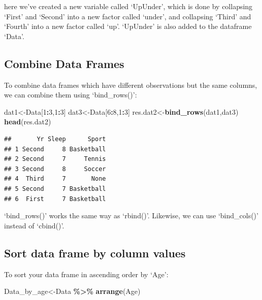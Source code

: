 \documentclass[
  openany]{book}
\newenvironment{Shaded}{\begin{snugshade}}{\end{snugshade}}
\newcommand{\DecValTok}[1]{\textcolor[rgb]{0.00,0.00,0.81}{#1}}
\newcommand{\FunctionTok}[1]{\textcolor[rgb]{0.13,0.29,0.53}{\textbf{#1}}}
\newcommand{\NormalTok}[1]{#1}
\newcommand{\OtherTok}[1]{\textcolor[rgb]{0.56,0.35,0.01}{#1}}
\newcommand{\SpecialCharTok}[1]{\textcolor[rgb]{0.81,0.36,0.00}{\textbf{#1}}}
\begin{document}
here we've created a new variable called `UpUnder', which is done by collapsing `First' and `Second' into a new factor called `under', and collapsing `Third' and `Fourth' into a new factor called `up'. `UpUnder' is also added to the dataframe `Data'.

\subsection{Combine Data Frames}\label{combine-data-frames-1}

To combine data frames which have different observations but the same columns, we can combine them using `bind\_rows()':

\begin{Shaded}
\begin{Highlighting}[]
\NormalTok{dat1}\OtherTok{\textless{}{-}}\NormalTok{Data[}\DecValTok{1}\SpecialCharTok{:}\DecValTok{3}\NormalTok{,}\DecValTok{1}\SpecialCharTok{:}\DecValTok{3}\NormalTok{]}
\NormalTok{dat3}\OtherTok{\textless{}{-}}\NormalTok{Data[}\DecValTok{6}\SpecialCharTok{:}\DecValTok{8}\NormalTok{,}\DecValTok{1}\SpecialCharTok{:}\DecValTok{3}\NormalTok{]}
\NormalTok{res.dat2}\OtherTok{\textless{}{-}}\FunctionTok{bind\_rows}\NormalTok{(dat1,dat3)}
\FunctionTok{head}\NormalTok{(res.dat2)}
\end{Highlighting}
\end{Shaded}

\begin{verbatim}
##       Yr Sleep      Sport
## 1 Second     8 Basketball
## 2 Second     7     Tennis
## 3 Second     8     Soccer
## 4  Third     7       None
## 5 Second     7 Basketball
## 6  First     7 Basketball
\end{verbatim}

`bind\_rows()' works the same way as `rbind()'. Likewise, we can use `bind\_cols()' instead of `cbind()'.

\subsection{Sort data frame by column values}\label{sort-data-frame-by-column-values-1}

To sort your data frame in ascending order by `Age':

\begin{Shaded}
\begin{Highlighting}[]
\NormalTok{Data\_by\_age}\OtherTok{\textless{}{-}}\NormalTok{Data }\SpecialCharTok{\%\textgreater{}\%} 
  \FunctionTok{arrange}\NormalTok{(Age)}
\end{Highlighting}
\end{Shaded}
\end{document}
